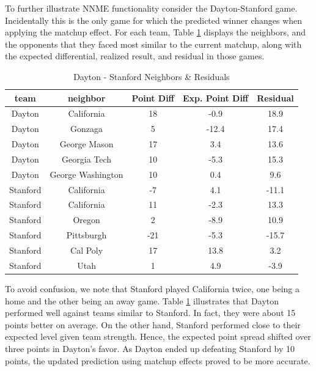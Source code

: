 \documentclass[letterpaper,12pt]{article}
\begin{document}
To further illustrate NNME functionality consider the Dayton-Stanford game.  Incidentally this is the only game for which the predicted winner changes when applying the matchup effect. For each team, Table \ref{tab:DayStan} displays the neighbors, and the opponents that they faced most similar to the current matchup, along with the expected differential, realized result, and residual in those games. 
\begin{table}[h!]
\caption{Dayton - Stanford Neighbors \& Residuals}
\small
\centering
\begin{tabular}{|c|cccc |}
   \hline
   \hline
 team & neighbor &  Point Diff& Exp. Point Diff & Residual \\
  \hline
Dayton & California & 18 & -0.9 & 18.9\\
Dayton & Gonzaga & 5 & -12.4 & 17.4\\
Dayton & George Mason& 17 & 3.4 & 13.6\\
Dayton &  Georgia Tech& 10 & -5.3 & 15.3\\
Dayton & George Washington& 10 & 0.4 & 9.6\\
\hline
Stanford & California&-7 & 4.1&-11.1 \\
Stanford & California &11 &-2.3 &13.3 \\
Stanford & Oregon&2 &-8.9 &10.9 \\
Stanford & Pittsburgh&-21 &-5.3 &-15.7 \\
Stanford & Cal Poly&17 &13.8 &3.2 \\
Stanford & Utah&1 &4.9 &-3.9 \\
   \hline
   \hline
\end{tabular}
\label{tab:DayStan}
\end{table}
To avoid confusion, we note that Stanford played California twice, one being a home and the other being an away game.  Table \ref{tab:DayStan} illustrates that Dayton performed well against teams similar to Stanford. In fact, they were about 15 points better on average. On the other hand, Stanford performed close to their expected level given team strength. Hence, the expected point spread shifted over three points in Dayton's favor. As Dayton ended up defeating Stanford by 10 points, the updated prediction using matchup effects proved to be more accurate.
\end{document}
